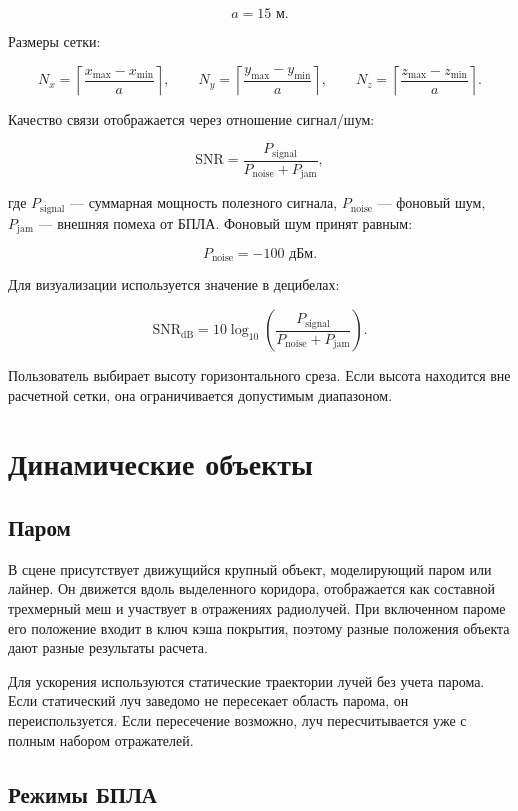 \documentclass[12pt,a4paper]{article}
\begin{document}
\[
a = 15\text{ м}.
\]

Размеры сетки:

\[
N_x = \left\lceil \frac{x_{\max} - x_{\min}}{a} \right\rceil,
\qquad
N_y = \left\lceil \frac{y_{\max} - y_{\min}}{a} \right\rceil,
\qquad
N_z = \left\lceil \frac{z_{\max} - z_{\min}}{a} \right\rceil.
\]

Качество связи отображается через отношение сигнал/шум:

\[
\mathrm{SNR} =
\frac{P_{\text{signal}}}
{P_{\text{noise}} + P_{\text{jam}}},
\]

где $P_{\text{signal}}$ --- суммарная мощность полезного сигнала, $P_{\text{noise}}$ --- фоновый шум, $P_{\text{jam}}$ --- внешняя помеха от БПЛА. Фоновый шум принят равным:

\[
P_{\text{noise}} = -100\text{ дБм}.
\]

Для визуализации используется значение в децибелах:

\[
\mathrm{SNR}_{\text{dB}} =
10\log_{10}
\left(
\frac{P_{\text{signal}}}
{P_{\text{noise}} + P_{\text{jam}}}
\right).
\]

Пользователь выбирает высоту горизонтального среза. Если высота находится вне расчетной сетки, она ограничивается допустимым диапазоном.

\section{Динамические объекты}

\subsection{Паром}

В сцене присутствует движущийся крупный объект, моделирующий паром или лайнер. Он движется вдоль выделенного коридора, отображается как составной трехмерный меш и участвует в отражениях радиолучей. При включенном пароме его положение входит в ключ кэша покрытия, поэтому разные положения объекта дают разные результаты расчета.

Для ускорения используются статические траектории лучей без учета парома. Если статический луч заведомо не пересекает область парома, он переиспользуется. Если пересечение возможно, луч пересчитывается уже с полным набором отражателей.

\subsection{Режимы БПЛА}
\end{document}
